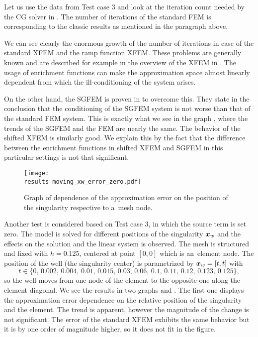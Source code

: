 Let us use the data from Test case 3 and look at the iteration count needed by the CG solver in .
The number of iterations of the standard FEM is corresponding to the classic results as mentioned in the paragraph above. 

We can see clearly the enormous growth of the number of iterations in case of the standard XFEM and the ramp 
function XFEM. These problems are generally known and are described for example in the overview of the XFEM in
\cite{fries_xfem_overview_2010}. The usage of enrichment functions can make the approximation space almost linearly 
dependent from which the ill-conditioning of the system arises. 

On the other hand, the SGFEM is proven in \cite{babuska_stable_2012} to overcome this. They state in the conclusion that
the conditioning of the SGFEM system is not worse than that of the standard FEM system.
This is exactly what we see in the graph , where the trends of the SGFEM and the FEM are nearly the same.
The behavior of the shifted XFEM is similarly good. We explain this by the fact that the difference between the enrichment functions
in shifted XFEM and SGFEM in this particular settings is not that significant.


\begin{figure}[!htb]
  \centering    
    \texttt{[image: \\results moving\_xw\_error\_zero.pdf]}
  \caption[Approximation error dependence on singularity position]{Graph of dependence of the approximation error
   on the position of the singularity respective to a~mesh node.}
  \label{fig:moving_xw_error}
\end{figure}
%
Another test is considered based on Test case 3, in which the source term is set zero. The model is solved for different 
positions of the singularity $\mathbf{\boldsymbol{x}}_w$ and the effects on the solution and the linear system is observed. The mesh is structured and fixed with $h=0.125$,
centered at point $[0,0]$ which is an~element node. The position of the well (the singularity center) is parametrized by $\mathbf{\boldsymbol{x}}_w = [t,t]$ with 
\[t\in\{0,\, 0.002,\, 0.004,\, 0.01,\, 0.015,\, 0.03,\, 0.06,\, 0.1,\, 0.11,\, 0.12,\, 0.123,\, 0.125\},\]
so the well moves from one node of the element to the opposite one along the element diagonal. 
We see the results in two graphs  and . The first one displays
the approximation error dependence on the relative position of the singularity and the element. The trend is apparent,
however the magnitude of the change is not significant. The error of the standard XFEM exhibits the same behavior
but it is by one order of magnitude higher, so it does not fit in the figure.

